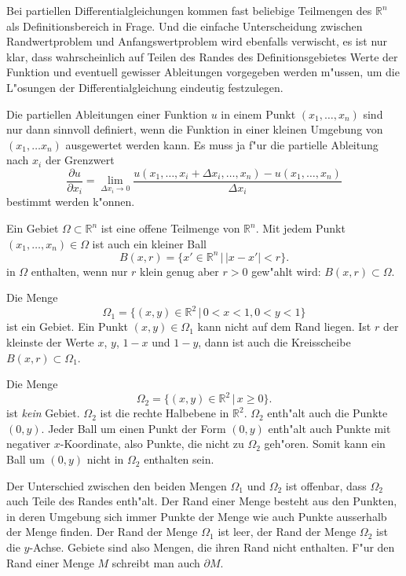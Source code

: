 Bei partiellen Differentialgleichungen kommen fast
beliebige Teilmengen des $\mathbb R^n$ als Definitionsbereich
in Frage. Und die einfache Unterscheidung zwischen Randwertproblem
und Anfangswertproblem wird ebenfalls verwischt, es ist nur klar,
dass wahrscheinlich auf Teilen des Randes des Definitionsgebietes
Werte der Funktion und eventuell gewisser Ableitungen
vorgegeben werden m"ussen, um die L"osungen der Differentialgleichung
eindeutig festzulegen.

Die partiellen Ableitungen einer Funktion $u$
in einem Punkt $(x_1,\dots,x_n)$ 
sind nur dann sinnvoll definiert, wenn die Funktion in einer 
kleinen Umgebung von $(x_1,\dots x_n)$ ausgewertet werden kann.
Es muss ja f"ur die partielle Ableitung nach $x_i$ der Grenzwert
\[
\frac{\partial u}{\partial x_i}=
\lim_{\Delta x_i\to 0}\frac{u(x_1,\dots,x_i+\Delta x_i, \dots ,x_n)-u(x_1,\dots,x_n)}{\Delta x_i}
\]
bestimmt werden k"onnen.

\begin{definition}
Ein Gebiet $\Omega\subset \mathbb R^n$ ist eine offene Teilmenge
von $\mathbb R^n$. Mit jedem Punkt $(x_1,\dots,x_n)\in\Omega$ ist
auch ein kleiner Ball
\[
B(x, r)=\{x'\in\mathbb R^n\,|\,|x-x'|<r\}.
\]
in $\Omega$ enthalten, wenn nur $r$ klein genug aber $r>0$ gew"ahlt wird:
$B(x,r)\subset\Omega$.
\end{definition}

\begin{beispiel}
Die Menge 
\[
\Omega_1=\{ (x,y)\in\mathbb R^2\,|\, 0 < x < 1, 0<y<1\}
\]
ist ein Gebiet. Ein Punkt $(x,y)\in\Omega_1$ kann nicht auf dem
Rand liegen. Ist $r$ der kleinste der Werte $x$, $y$, $1-x$ und $1-y$,
dann ist auch die Kreisscheibe $B(x,r)\subset\Omega_1$.
\end{beispiel}

\begin{beispiel}
Die Menge 
\[
\Omega_2 = \{ (x,y)\in\mathbb R^2\,|\, x\ge 0\}.
\]
ist {\it kein} Gebiet. $\Omega_2$ ist die rechte Halbebene in $\mathbb R^2$.
$\Omega_2$ enth"alt auch die Punkte $(0,y)$. Jeder Ball um einen
Punkt der Form $(0,y)$ enth"alt auch Punkte mit negativer
$x$-Koordinate, also Punkte, die nicht zu $\Omega_2$ geh"oren.
Somit kann ein Ball um $(0,y)$ nicht in $\Omega_2$ enthalten sein.
\end{beispiel}

Der Unterschied zwischen den beiden Mengen $\Omega_1$ und $\Omega_2$
ist offenbar, dass $\Omega_2$ auch Teile des Randes
enth"alt. Der Rand einer Menge besteht aus den Punkten, in deren
Umgebung sich immer Punkte der Menge wie auch Punkte ausserhalb
der Menge finden. Der Rand der Menge $\Omega_1$ ist leer, der Rand
der Menge $\Omega_2$ ist die $y$-Achse. Gebiete sind also Mengen,
die ihren Rand nicht enthalten. F"ur den Rand einer Menge $M$
schreibt man auch $\partial M$.

